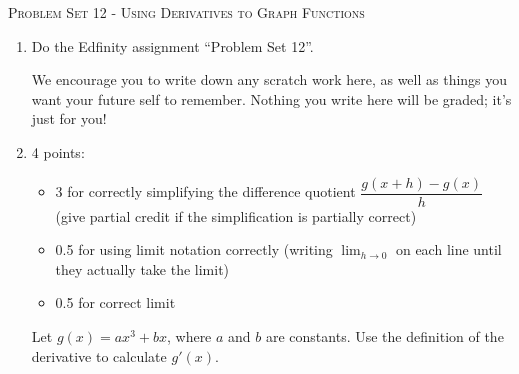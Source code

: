 \documentclass{article}
\newcommand{\doedfinity}[2][\newpage]{
  \begin{problem}[#1]
    Do the Edfinity assignment ``Problem Set #2''.

    We encourage you to write down any scratch work here, as well as
    things you want your future self to remember. Nothing you write
    here will be graded; it's just for you!
  \end{problem}
}
\begin{document}
\begin{center}
  \large\textsc{Problem Set 12 - Using Derivatives to Graph Functions}
\end{center}

\begin{enumerate}
\item  {}

  \doedfinity{12}

\item \label{deriv-of-ax^3+bx}

  \begin{grading} 
    4 points:
    \begin{itemize}[nosep]
    \item 3 for correctly simplifying the difference quotient $\dfrac{ g(x+h) - g(x) }{h}$ (give partial credit if the simplification is partially correct)
    \item 0.5 for using limit notation correctly (writing $\displaystyle \lim_{h \to 0}$ on each line until they actually take the limit)
    \item 0.5 for correct limit
    \end{itemize}
  \end{grading} 

  \begin{problem}[\vfill]
    Let $g(x) = ax^3 + bx$, where $a$ and $b$ are constants. Use the definition of the derivative to calculate $g'(x)$. 
  \end{problem}


\end{enumerate}
\end{document}
